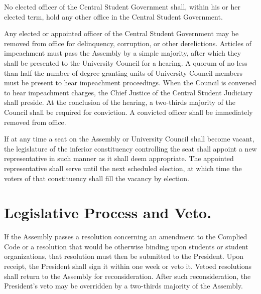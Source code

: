     No elected officer of the Central Student Government shall, within his or her elected term, hold any other office in the Central Student Government.

    Any elected or appointed officer of the Central Student Government may be removed from office for delinquency, corruption, or other derelictions. Articles of impeachment must pass the Assembly by a simple majority, after which they shall be presented to the University Council for a hearing. A quorum of no less than half the number of degree-granting units of University Council members must be present to hear impeachment proceedings. When the Council is convened to hear impeachment charges, the Chief Justice of the Central Student Judiciary shall preside. At the conclusion of the hearing, a two-thirds majority of the Council shall be required for conviction. A convicted officer shall be immediately removed from office.

    If at any time a seat on the Assembly or University Council shall become vacant, the legislature of the inferior constituency controlling the seat shall appoint a new representative in such manner as it shall deem appropriate. The appointed representative shall serve until the next scheduled election, at which time the voters of that constituency shall fill the vacancy by election.

\section{Legislative Process and Veto.}
    If the Assembly passes a resolution concerning an amendment to the Complied Code or a resolution that would be otherwise binding upon students or student organizations, that resolution must then be submitted to the President. Upon receipt, the President shall sign it within one week or veto it. Vetoed resolutions shall return to the Assembly for reconsideration. After such reconsideration, the President's veto may be overridden by a  two-thirds majority of the Assembly.